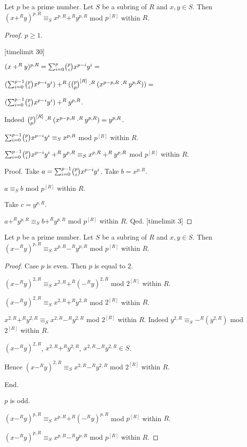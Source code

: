 \documentclass[english,11pt]{article}
\begin{document}
\begin{forthel}
\begin{lemma} Let $p$ be a prime number.
Let $S$ be a subring of $R$ and $x,y \in S$. 
Then $(x +^{R} y)^{p,R} \equiv_{S} x^{p,R} +^{R} y^{p,R}$ mod $p^{[R]}$ within $R$.
\end{lemma}

\begin{proof} $p \geq 1$.

[timelimit 30]

$(x +^{R} y)^{p,R} =  \binsum{p}{p}{x}{y}{R} =$

$ (\binsum{p-1}{p}{x}{y}{R}) +^{R} (\cho{p}{p}^{[R]} \cdot^{R} (x^{p - p,R} \cdot^{R} y^{p,R})) =$

$ (\binsum{p-1}{p}{x}{y}{R}) +^{R} y^{p,R}$.

Indeed $\cho{p}{p}^{[R]} \cdot^{R} (x^{p - p,R} \cdot^{R} y^{p,R}) = y^{p,R}$.

$ \binsum{p-1}{p}{x}{y}{R} \equiv_{S} x^{p,R}$ mod $p^{[R]}$ within $R$.

$ \binsum{p-1}{p}{x}{y}{R} +^{R} y^{p,R} \equiv_{S} x^{p,R} +^{R} y^{p,R}$ mod $p^{[R]}$ within $R$.

Proof.
Take $a = \binsum{p-1}{p}{x}{y}{R}$.
Take $b = x^{p,R}$. 

$a \equiv_{S} b $ mod $p^{[R]}$ within $R$.

Take $c = y^{p,R}$.

$a +^{R} y^{p,R} \equiv_{S} b +^{R} y^{p,R} $ mod $p^{[R]}$ within $R$.
Qed.
[timelimit 3]
\end{proof}

\begin{lemma} Let $p$ be a prime number.
Let $S$ be a subring of $R$ and $x,y \in S$. 
Then $(x -^{R} y)^{p,R} \equiv_{S} x^{p,R} -^{R} y^{p,R}$ mod $p^{[R]}$ within $R$.
\end{lemma}
\begin{proof}

Case $p$ is even. Then $p$ is equal to $2$.

$(x -^{R} y)^{2,R} \equiv_{S} x^{2,R} +^{R} (-^{R}y)^{2,R}$ mod $2^{[R]}$ within $R$.

$(x -^{R} y)^{2,R} \equiv_{S} x^{2,R} +^{R} y^{2,R}$ mod $2^{[R]}$ within $R$.

$x^{2,R} +^{R} y^{2,R} \equiv_{S} x^{2,R} -^{R} y^{2,R}$ mod $2^{[R]}$ within $R$.
Indeed $y^{2,R} \equiv_{S} -^{R}(y^{2,R})$ mod $2^{[R]}$ within $R$.

$(x -^{R} y)^{2,R}$, $x^{2,R} +^{R} y^{2,R}$, 
$x^{2,R} -^{R} y^{2,R} \in S$.

Hence $(x -^{R} y)^{2,R} \equiv_{S} x^{2,R} -^{R} y^{2,R}$ mod $2^{[R]}$ within $R$.

End. 

$p$ is odd.

$(x -^{R} y)^{p,R} \equiv_{S} x^{p,R} +^{R} (-^{R}y)^{p,R}$ mod $p^{[R]}$ within $R$.

$(x -^{R} y)^{p,R} \equiv_{S} x^{p,R} -^{R} y^{p,R}$ mod $p^{[R]}$ within $R$.
\end{proof}
\end{forthel}
\end{document}
